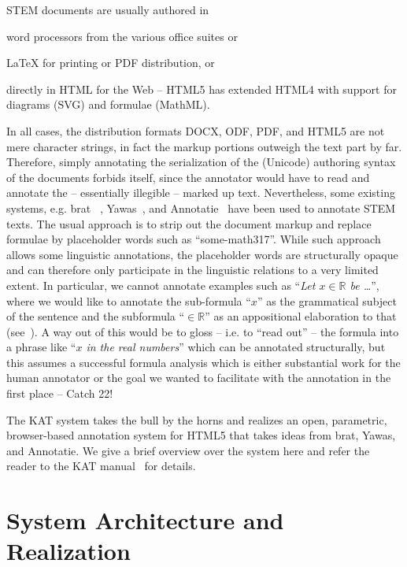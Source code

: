 \documentclass{llncs}
\def\nlex#1{``\emph{#1}''}
\def\KAT{\textsf{KAT}\xspace}
\begin{document}
STEM documents are usually authored in
\begin{inparaenum}[\em i\rm)]
\item word processors from the various office suites or
\item {\LaTeX} for printing or PDF distribution, or
\item directly in HTML for the Web -- HTML5 has extended HTML4 with support for diagrams
  (SVG) and formulae (MathML).
\end{inparaenum}
In all cases, the distribution formats DOCX, ODF, PDF, and HTML5 are not mere character
strings, in fact the markup portions outweigh the text part by far. Therefore, simply
annotating the serialization of the (Unicode) authoring syntax of the documents forbids
itself, since the annotator would have to read and annotate the -- essentially illegible
-- marked up text. Nevertheless, some existing systems,
 e.g. \textsf{brat} ~\cite {brat:on}, \textsf{Yawas}~\cite{yawas:on}, and
  \textsf{Annotatie}~\cite{annotatie:on} have been used
to annotate STEM texts. The usual approach is to strip out the document markup and
 replace formulae by placeholder words such as ``some-math317''.
While such approach allows some linguistic annotations, the placeholder words are
 structurally opaque and can therefore only participate in the linguistic relations
 to a very limited extent. In particular, we cannot
annotate examples such as \nlex{Let $x\in\mathbb{R}$ be \ldots}, where we would like to
annotate the sub-formula \nlex{$x$} as the grammatical subject of the sentence and the
subformula \nlex{$\in\mathbb{R}$} as an appositional elaboration to that
(see~\cite{Wolska:PHD}). A way out of this would be to gloss -- i.e. to ``read out'' --
the formula into a phrase like \nlex{$x$ in the real numbers} which can be annotated
structurally, but this assumes a successful formula analysis which is either substantial
work for the human annotator or the goal we wanted to facilitate with the annotation in
the first place -- Catch 22!

The \KAT system takes the bull by the horns and realizes an open, parametric,
browser-based annotation system for HTML5 that takes ideas from \textsf{brat},
\textsf{Yawas}, and \textsf{Annotatie}. We give a brief overview over the system here and
refer the reader to the \KAT manual~\cite{DumGinKoh:katsdm14} for details.

\section{System Architecture and Realization}\label{sec:arch}
\end{document}
